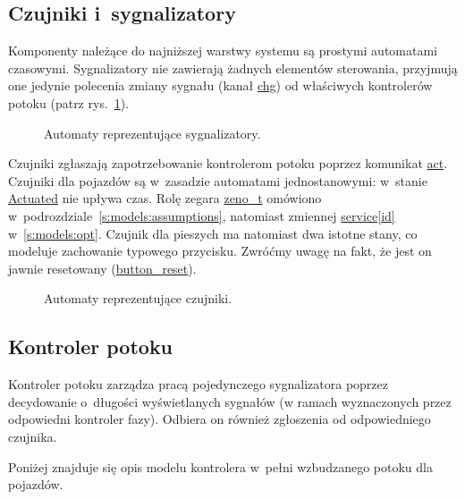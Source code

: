 \documentclass{pracamgr}
\newcommand{\imgr}[1]{rys.~\ref{#1}}
\theoremstyle{plain}
\begin{document}
\subsection{Czujniki i~sygnalizatory}
\label{ss:models:models:dets}
Komponenty należące do najniższej warstwy systemu są prostymi
automatami czasowymi.
Sygnalizatory nie zawierają żadnych elementów sterowania, przyjmują
one jedynie polecenia zmiany sygnału (kanał \url{chg}) od właściwych
kontrolerów potoku (patrz \imgr{img:lights}).

\begin{figure}
  \centering
  \hspace{1cm}
  \caption{Automaty reprezentujące sygnalizatory.}
  \label{img:lights}
\end{figure}

Czujniki zgłaszają zapotrzebowanie kontrolerom potoku poprzez
komunikat \url{act}. Czujniki dla pojazdów są w~zasadzie automatami
jednostanowymi: w~stanie \url{Actuated} nie upływa czas. Rolę
zegara \url{zeno_t} omówiono w~podrozdziale~\ref{s:models:assumptions}, natomiast
zmiennej \url{service[id]} w~\ref{s:models:opt}. Czujnik dla pieszych
ma natomiast dwa istotne stany, co modeluje zachowanie typowego
przycisku. Zwróćmy uwagę na fakt, że jest on jawnie resetowany
(\url{button_reset}).

\begin{figure}
  \centering
  \hspace{1cm}
  \caption{Automaty reprezentujące czujniki.}
  \label{img:detectors}
\end{figure}

\subsection{Kontroler potoku}
Kontroler potoku zarządza pracą pojedynczego sygnalizatora poprzez
decydowanie o~długości wyświetlanych sygnałów (w ramach wyznaczonych
przez odpowiedni kontroler fazy). Odbiera on również zgłoszenia od
odpowiedniego czujnika.

Poniżej znajduje się opis modelu kontrolera w~pełni wzbudzanego potoku
dla pojazdów.
\end{document}

